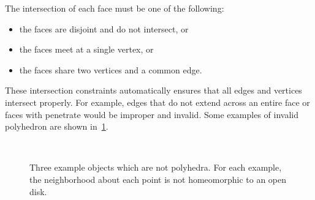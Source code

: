 The intersection of each face must be one of the following:
\begin{itemize}
    \item the faces are disjoint and do not intersect, or
    \item the faces meet at a single vertex, or
    \item the faces share two vertices and a common edge.
\end{itemize}
These intersection constraints automatically ensures that all edges and vertices intersect properly.
For example, edges that do not extend across an entire face or faces with penetrate would be improper and invalid.
Some examples of invalid polyhedron are shown in~\cref{fig:improper_polyhedrons}.
\begin{figure}[h]
    \centering
    ~
    ~
    \caption{Three example objects which are not polyhedra. For each example, the neighborhood about each point is not homeomorphic to an open disk.~\label{fig:improper_polyhedrons}}
\end{figure}

